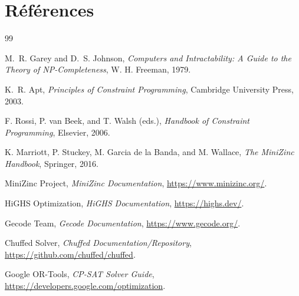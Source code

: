 \documentclass[12pt,a4paper]{article}
\begin{document}
\section{Références}
\begin{thebibliography}{99}

M.~R. Garey and D.~S. Johnson,
\textit{Computers and Intractability: A Guide to the Theory of NP-Completeness},
W. H. Freeman, 1979.

K.~R. Apt,
\textit{Principles of Constraint Programming},
Cambridge University Press, 2003.

F. Rossi, P. van Beek, and T. Walsh (eds.),
\textit{Handbook of Constraint Programming},
Elsevier, 2006.

K. Marriott, P. Stuckey, M. Garcia de la Banda, and M. Wallace,
\textit{The MiniZinc Handbook},
Springer, 2016.

MiniZinc Project,
\textit{MiniZinc Documentation},
\url{https://www.minizinc.org/}.

HiGHS Optimization,
\textit{HiGHS Documentation},
\url{https://highs.dev/}.

Gecode Team,
\textit{Gecode Documentation},
\url{https://www.gecode.org/}.

Chuffed Solver,
\textit{Chuffed Documentation/Repository},
\url{https://github.com/chuffed/chuffed}.

Google OR-Tools,
\textit{CP-SAT Solver Guide},
\url{https://developers.google.com/optimization}.

\end{thebibliography}
\end{document}
